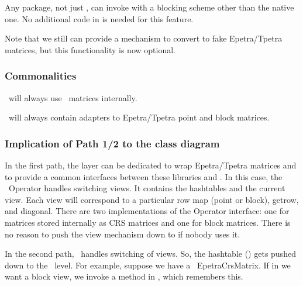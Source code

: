 \item Any \Trilinos package, not just \muelu, can invoke \Tifpack with a blocking scheme other than the native one.
No additional code in \Tifpack is needed for this feature.
\ee

Note that we still can provide a mechanism to convert \cthulhu to fake Epetra/Tpetra matrices, but this functionality is now optional.%

\subsubsection{Commonalities}
%
\be
  \item \mulu\ will always use \cthulhu\ matrices internally.
  \item \cthulhu\ will always contain adapters to Epetra/Tpetra point and block matrices.
\ee


\subsubsection{Implication of Path 1/2 to the class diagram}

In the first path, the \cthulhu layer can be dedicated to wrap Epetra/Tpetra matrices and to provide a common interfaces between these
libraries and \mulu. In this case, the \mulu\ Operator handles switching views. It contains the hashtables and the current view. Each view
will correspond to a particular row map (point or block), getrow, and diagonal. There are two implementations of the \mulu Operator
interface: one for matrices stored internally as CRS matrices and one for block matrices. There is no reason to push the view mechanism
down to \cthulhu if nobody uses it.

In the second path, \cthulhu\ handles switching of views.
So, the hashtable () gets pushed down to the \cthulhu\ level.
For example, suppose we have a \cthulhu\ EpetraCrsMatrix.  If in \mulu we want a block
view, we invoke a method in \cthulhu, which remembers this.\\

